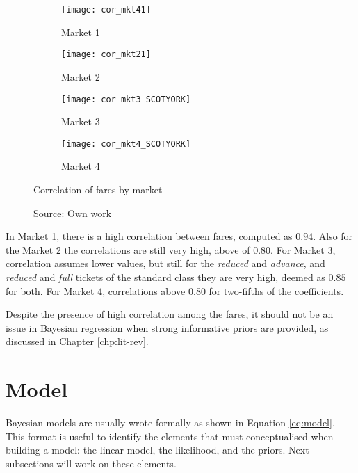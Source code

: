 \begin{figure}[H]
\centering
\begin{subfigure}{.5\textwidth}
  \centering
  \texttt{[image: cor\_mkt41]}
  \caption{Market 1}
  \label{fig:cor_mkt4}
\end{subfigure}%
\begin{subfigure}{.5\textwidth}
  \centering
  \texttt{[image: cor\_mkt21]}
  \caption{Market 2}
  \label{fig:cor_mkt2}
\end{subfigure}%

\begin{subfigure}{.5\textwidth}
  \centering
  \texttt{[image: cor\_mkt3\_SCOTYORK]}
  \caption{Market 3}
  \label{fig:cor_mkt3}
  \end{subfigure}%
\begin{subfigure}{.5\textwidth}
  \centering
  \texttt{[image: cor\_mkt4\_SCOTYORK]}
  \caption{Market 4}
  \label{fig:cor_mkt1}
\end{subfigure}%
\caption{Correlation of fares by market}
\label{fig:cor}
\caption*{Source: Own work}
\end{figure}

In Market 1, there is a high correlation between fares, computed as $0.94$. Also for the Market 2 the correlations are still very high, above of $0.80$. For Market 3, correlation assumes lower values, but still for the \textit{reduced} and \textit{advance}, and \textit{reduced} and \textit{full} tickets of the standard class they are very high, deemed as $0.85$ for both. For Market 4, correlations above $0.80$ for two-fifths of the coefficients.

Despite the presence of high correlation among the fares, it should not be an issue in Bayesian regression when strong informative priors are provided, as discussed in Chapter \ref{chp:lit-rev}. 


\section{Model}

Bayesian models are usually wrote formally as shown in Equation \ref{eq:model}. This format is useful to identify the elements that must conceptualised when building a model: the linear model, the likelihood, and the priors. Next subsections will work on these elements.

